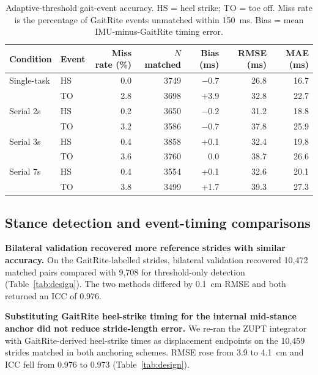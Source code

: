 \documentclass[11pt]{article}
\begin{document}
\begin{table}[!ht]
\centering
\caption{Adaptive-threshold gait-event accuracy. HS = heel strike; TO = toe off. Miss rate is the percentage of GaitRite events unmatched within 150~ms. Bias = mean IMU-minus-GaitRite timing error.}
\label{tab:events}
\small
\begin{tabular}{@{}llrrrrr@{}}
\toprule
Condition & Event & Miss rate (\%) & $N$ matched & Bias (ms) & RMSE (ms) & MAE (ms) \\
\midrule
Single-task & HS & 0.0 & 3749 & $-0.7$ & 26.8 & 16.7 \\
            & TO & 2.8 & 3698 & +3.9 & 32.8 & 22.7 \\
Serial 2s   & HS & 0.2 & 3650 & $-0.2$ & 31.2 & 18.8 \\
            & TO & 3.2 & 3586 & $-0.7$ & 37.8 & 25.9 \\
Serial 3s   & HS & 0.4 & 3858 & +0.1 & 32.4 & 19.8 \\
            & TO & 3.6 & 3760 & 0.0 & 38.7 & 26.6 \\
Serial 7s   & HS & 0.4 & 3554 & +0.1 & 32.6 & 20.1 \\
            & TO & 3.8 & 3499 & +1.7 & 39.3 & 27.3 \\
\bottomrule
\end{tabular}
\end{table}

\FloatBarrier
\subsection{Stance detection and event-timing comparisons}

\textbf{Bilateral validation recovered more reference strides with similar accuracy.} On the GaitRite-labelled strides, bilateral validation recovered 10{,}472 matched pairs compared with 9{,}708 for threshold-only detection (Table~\ref{tab:design}). The two methods differed by 0.1~cm RMSE and both returned an ICC of 0.976.

\textbf{Substituting GaitRite heel-strike timing for the internal mid-stance anchor did not reduce stride-length error.} We re-ran the ZUPT integrator with GaitRite-derived heel-strike times as displacement endpoints on the 10{,}459 strides matched in both anchoring schemes. RMSE rose from 3.9 to 4.1~cm and ICC fell from 0.976 to 0.973 (Table~\ref{tab:design}).
\end{document}
